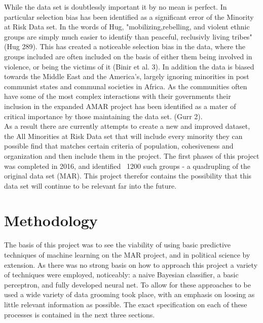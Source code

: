 \documentclass[12pt]{article}
\begin{document}
	While the data set is doubtlessly important it by no mean is perfect. In particular selection bias has been identified as a significant error of the Minority at Risk Data set. In the words of Hug, {"mobilizing,rebelling, and violent ethnic groups are simply much easier to identify than peaceful, reclusivly living tribes" (Hug 289)}. This has created a noticeable selection bias in the data, where the groups included are often included on the basis of either them being involved in violence, or being the victims of it (Binir et al. 3). In addition the data is biased towards the Middle East and the America's, largely ignoring minorities in post communist states and communal societies in Africa. As the communities often have some of the most complex interactions with their governments their inclusion in the expanded AMAR project has been identified as a mater of critical importance by those maintaining the data set.  (Gurr 2). \\

	As a result there are currently attempts to create a new and improved dataset, the All Minorities at Risk Data set that will include every minority they can possible find that matches certain criteria of population, cohesiveness and organization and then include them in the project. The first phases of this project was completed in 2016, and identified ~1200 such groups - a quadrupling of the original data set (MAR). This project therefor contains the possibility that this data set will continue to be relevant far into the future. 

\section{Methodology}
The basis of this project was to see the viability of using basic predictive techniques of machine learning on the MAR project, and in political science by extension. As there was no strong basis on how to approach this project a variety of techniques were employed, noticeably: a naive Bayesian classifier, a basic perceptron, and fully developed neural net. To allow for these approaches to be used a wide variety of data grooming took place, with an emphasis on loosing as little relevant information as possible. The exact specification on each of these processes is contained in the next three sections. 
\end{document}
